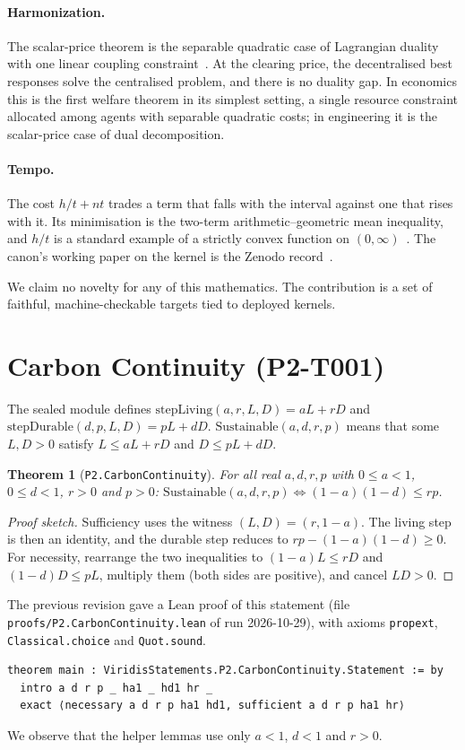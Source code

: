 \documentclass[11pt]{article}
\newtheorem{theorem}{Theorem}
\theoremstyle{definition}
\theoremstyle{remark}
\begin{document}
\paragraph{Harmonization.} The scalar-price theorem is the separable quadratic case of Lagrangian duality with
one linear coupling constraint~\cite{BoydVandenberghe2004}.
At the clearing price, the decentralised best responses solve the centralised problem, and there is no duality gap.
In economics this is the first welfare theorem in its simplest setting, a single resource constraint allocated among
agents with separable quadratic costs; in engineering it is the scalar-price case of dual decomposition.

\paragraph{Tempo.} The cost $h/t+nt$ trades a term that falls with the interval against one that rises with it.
Its minimisation is the two-term arithmetic--geometric mean inequality, and $h/t$ is a standard example of a strictly convex
function on $(0,\infty)$~\cite{BoydVandenberghe2004}.
The canon's working paper on the kernel is the Zenodo record~\cite{HartTempo2026}.

We claim no novelty for any of this mathematics. The contribution is a set of faithful, machine-checkable targets tied
to deployed kernels.

\section{Carbon Continuity (P2-T001)}
The sealed module defines $\mathrm{stepLiving}(a,r,L,D)=aL+rD$ and $\mathrm{stepDurable}(d,p,L,D)=pL+dD$.
$\mathrm{Sustainable}(a,d,r,p)$ means that some $L,D>0$ satisfy $L\le aL+rD$ and $D\le pL+dD$.
\begin{theorem}[\texttt{P2.CarbonContinuity}]
For all real $a,d,r,p$ with $0\le a<1$, $0\le d<1$, $r>0$ and $p>0$:
$\mathrm{Sustainable}(a,d,r,p)\iff (1-a)(1-d)\le rp$.
\end{theorem}
\begin{proof}[Proof sketch]
Sufficiency uses the witness $(L,D)=(r,1-a)$. The living step is then an identity, and the durable step reduces to
$rp-(1-a)(1-d)\ge 0$. For necessity, rearrange the two inequalities to $(1-a)L\le rD$ and $(1-d)D\le pL$,
multiply them (both sides are positive), and cancel $LD>0$.
\end{proof}
The previous revision gave a Lean proof of this statement (file \texttt{proofs/P2.CarbonContinuity.lean} of run
2026-10-29), with axioms \texttt{propext}, \texttt{Classical.choice} and \texttt{Quot.sound}.
\begin{lstlisting}
theorem main : ViridisStatements.P2.CarbonContinuity.Statement := by
  intro a d r p _ ha1 _ hd1 hr _
  exact ⟨necessary a d r p ha1 hd1, sufficient a d r p ha1 hr⟩
\end{lstlisting}
We observe that the helper lemmas use only $a<1$, $d<1$ and $r>0$.
\end{document}
